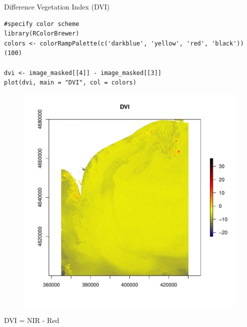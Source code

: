 \documentclass[10pt]{beamer}
\begin{document}
\begin{frame}[fragile]{Difference Vegetation Index (DVI)}
\begin{lstlisting}[firstnumber = 37]
#specify color scheme
library(RColorBrewer)
colors <- colorRampPalette(c('darkblue', 'yellow', 'red', 'black'))(100)

dvi <- image_masked[[4]] - image_masked[[3]]  
plot(dvi, main = "DVI", col = colors)
\end{lstlisting}
\begin{minipage}{0.55\textwidth}
\begin{figure}
\centering
\includegraphics[width=.9\textwidth]{images/dvi.pdf}
\end{figure}   
\end{minipage}
\begin{minipage}[b]{0.4\textwidth}
\centering \Large DVI = NIR - Red
\end{minipage} 
\end{frame}
\end{document}
